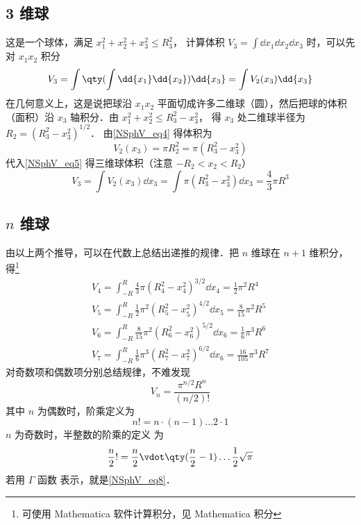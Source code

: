 \subsection{ 3 维球}
这是一个球体，满足 $x_1^2 + x_2^2 + x_3^2 \leqslant R_3^2$， 计算体积 $V_3 = \int \dd{x_1}\dd{x_2} \dd{x_3}$ 时，可以先对 $x_1 x_2$ 积分
\begin{equation}\label{NSphV_eq5}
V_3 = \int \qty(\int \dd{x_1} \dd{x_2}) \dd{x_3} = \int V_2(x_3) \dd{x_3}
\end{equation}
在几何意义上，这是说把球沿 $x_1 x_2$ 平面切成许多二维球（圆），然后把球的体积（面积）沿 $x_3$ 轴积分．由 $x_1^2 + x_2^2 \leqslant R_3^2 - x_3^2$， 得 $x_3$ 处二维球半径为 $R_2 = (R_3^2 - x_3^2)^{1/2}$． 由\autoref{NSphV_eq4} 得体积为
\begin{equation}\label{NSphV_eq6}
V_2 (x_3) = \pi R_2^2 = \pi (R_3^2 - x_3^2)
\end{equation}
代入\autoref{NSphV_eq5} 得三维球体积（注意 $-R_2 < x_2 < R_2$）
\begin{equation}\label{NSphV_eq7}
V_3 = \int V_2(x_3) \dd{x_3} = \int \pi (R_3^2 - x_3^2)\dd{x_3}  = \frac43 \pi R^3
\end{equation}
\subsection{ $n$ 维球}
由以上两个推导，可以在代数上总结出递推的规律．把 $n$ 维球在 $n+1$ 维积分，得\footnote{可使用  Mathematica 软件计算积分，见 Mathematica 积分}%
\begin{gather}
V_4 = \int_{-R}^R \frac43 \pi (R_4^2 - x_4^2)^{3/2} \dd{x_4}  = \frac12 \pi^2 R^4\\
V_5 = \int_{-R}^R \frac12 \pi^2 (R_5^2 - x_5^2)^{4/2} \dd{x_5}  = \frac{8}{15} \pi^2 R^5\\
V_6 = \int_{-R}^R \frac{8}{15} \pi ^2 (R_6^2 - x_6^2)^{5/2} \dd{x_6} = \frac16 \pi^3 R^6\\
V_7 = \int_{-R}^R \frac16 \pi^3 (R_7^2 - x_7^2)^{6/2} \dd{x_6} = \frac{16}{105} \pi^3 R^7
\end{gather}
对奇数项和偶数项分别总结规律，不难发现
\begin{equation}
V_n = \frac{\pi^{n/2}{R^n}}{(n/2)!}
\end{equation}
其中 $n$ 为偶数时，阶乘定义为
\begin{equation}
n! = n\cdot (n-1)\dots 2\cdot 1
\end{equation}
$n$ 为奇数时，半整数的阶乘的定义 为
\begin{equation}
\frac{n}{2}! = \frac{n}{2} \vdot \qty(\frac{n}{2}-1) \dots \frac12 \sqrt{\pi}
\end{equation}
若用 $\Gamma $ 函数 表示，就是\autoref{NSphV_eq8}．
